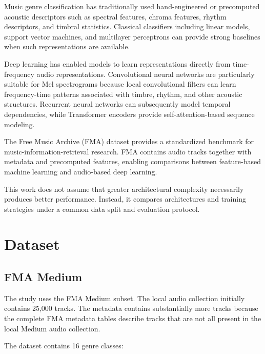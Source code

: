 \documentclass[11pt,a4paper]{article}
\begin{document}
Music genre classification has traditionally used hand-engineered or precomputed acoustic descriptors such as spectral features, chroma features, rhythm descriptors, and timbral statistics. Classical classifiers including linear models, support vector machines, and multilayer perceptrons can provide strong baselines when such representations are available.

Deep learning has enabled models to learn representations directly from time-frequency audio representations. Convolutional neural networks are particularly suitable for Mel spectrograms because local convolutional filters can learn frequency-time patterns associated with timbre, rhythm, and other acoustic structures. Recurrent neural networks can subsequently model temporal dependencies, while Transformer encoders provide self-attention-based sequence modeling.

The Free Music Archive (FMA) dataset provides a standardized benchmark for music-information-retrieval research. FMA contains audio tracks together with metadata and precomputed features, enabling comparisons between feature-based machine learning and audio-based deep learning.

This work does not assume that greater architectural complexity necessarily produces better performance. Instead, it compares architectures and training strategies under a common data split and evaluation protocol.

\section{Dataset}

\subsection{FMA Medium}

The study uses the FMA Medium subset. The local audio collection initially contains 25,000 tracks. The metadata contains substantially more tracks because the complete FMA metadata tables describe tracks that are not all present in the local Medium audio collection.

The dataset contains 16 genre classes:
\end{document}
